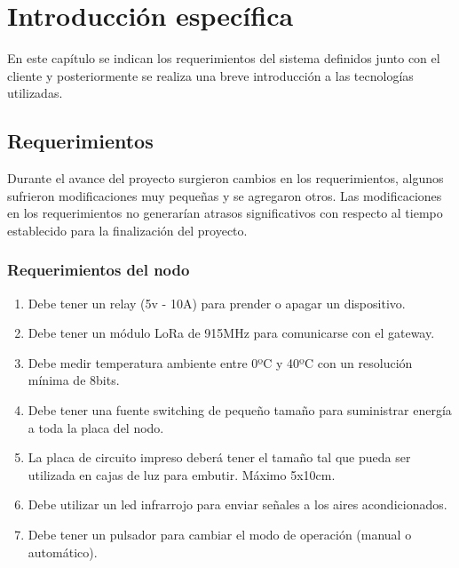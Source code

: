 \chapter{Introducción específica} %

\label{Chapter2}


En este capítulo se indican los requerimientos del sistema definidos junto con el cliente y posteriormente se realiza una breve introducción a las tecnologías utilizadas.

\section{Requerimientos}
\label{sec:introducción}

Durante el avance del proyecto surgieron cambios en los requerimientos, algunos sufrieron modificaciones muy pequeñas y se agregaron otros.
Las modificaciones en los requerimientos no generarían atrasos significativos con respecto al tiempo establecido para la finalización del proyecto.

\subsection{Requerimientos del nodo}

\begin{enumerate}
	\item 	Debe tener un relay (5v - 10A) para prender o apagar un dispositivo.
	\item 	Debe tener un módulo LoRa de 915MHz para comunicarse con el gateway.
	\item	Debe medir temperatura ambiente entre 0ºC y 40ºC con un resolución mínima de 8bits.
	\item	Debe tener una fuente switching de pequeño tamaño para suministrar energía a toda la placa del nodo.
	\item	La placa de circuito impreso deberá tener el tamaño tal que pueda ser utilizada en cajas de luz para embutir. Máximo 5x10cm.
	\item	Debe utilizar un led infrarrojo para enviar señales a los aires acondicionados.
	\item	Debe tener un pulsador para cambiar el modo de operación (manual o automático).
\end{enumerate}

